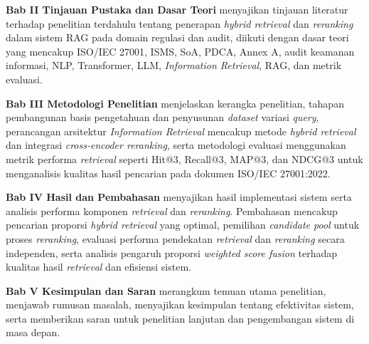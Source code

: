 \noindent \textbf{Bab II Tinjauan Pustaka dan Dasar Teori} menyajikan tinjauan literatur terhadap penelitian terdahulu tentang penerapan \textit{hybrid retrieval} dan \textit{reranking} dalam sistem RAG pada domain regulasi dan audit, diikuti dengan dasar teori yang mencakup ISO/IEC 27001, ISMS, SoA, PDCA, Annex A, audit keamanan informasi, NLP, Transformer, LLM, \textit{Information Retrieval}, RAG, dan metrik evaluasi.

\noindent \textbf{Bab III Metodologi Penelitian} menjelaskan kerangka penelitian, tahapan pembangunan basis pengetahuan dan penyusunan \textit{dataset} variasi \textit{query}, perancangan arsitektur \textit{Information Retrieval} mencakup metode \textit{hybrid retrieval} dan integrasi \textit{cross-encoder reranking}, serta metodologi evaluasi menggunakan metrik performa \textit{retrieval} seperti Hit@3, Recall@3, MAP@3, dan NDCG@3 untuk menganalisis kualitas hasil pencarian pada dokumen ISO/IEC 27001:2022.

\noindent \textbf{Bab IV Hasil dan Pembahasan} menyajikan hasil implementasi sistem serta analisis performa komponen \textit{retrieval} dan \textit{reranking}. Pembahasan mencakup pencarian proporsi \textit{hybrid retrieval} yang optimal, pemilihan \textit{candidate pool} untuk proses \textit{reranking}, evaluasi performa pendekatan \textit{retrieval} dan \textit{reranking} secara independen, serta analisis pengaruh proporsi \textit{weighted score fusion} terhadap kualitas hasil \textit{retrieval} dan efisiensi sistem.

\noindent \textbf{Bab V Kesimpulan dan Saran} merangkum temuan utama penelitian, menjawab rumusan masalah, menyajikan kesimpulan tentang efektivitas sistem, serta memberikan saran untuk penelitian lanjutan dan pengembangan sistem di masa depan.

